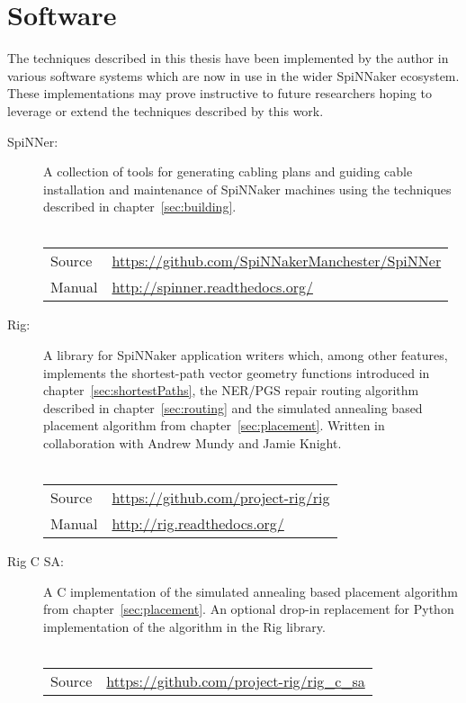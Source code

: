 \chapter{Software}
	\label{sec:software}
	
	The techniques described in this thesis have been implemented by the author
	in various software systems which are now in use in the wider SpiNNaker
	ecosystem. These implementations may prove instructive to future researchers
	hoping to leverage or extend the techniques described by this work.
	
	\begin{description}
		
		\item [SpiNNer:] A collection of tools for generating cabling plans and
		guiding cable installation and maintenance of SpiNNaker machines using the
		techniques described in chapter~\ref{sec:building}.
		\\
		\vspace*{-1.25em}
		\\
		\begin{tabular}{ll}
			Source & \url{https://github.com/SpiNNakerManchester/SpiNNer} \\
			Manual & \url{http://spinner.readthedocs.org/} \\
		\end{tabular}
		
		\item [Rig:] A library for SpiNNaker application writers which, among other
		features, implements the shortest-path vector geometry functions introduced
		in chapter~\ref{sec:shortestPaths}, the NER/PGS repair routing algorithm
		described in chapter~\ref{sec:routing} and the simulated annealing based
		placement algorithm from chapter~\ref{sec:placement}. Written in
		collaboration with Andrew Mundy and Jamie Knight.
		\\
		\vspace*{-1.25em}
		\\
		\begin{tabular}{ll}
			Source & \url{https://github.com/project-rig/rig} \\
			Manual & \url{http://rig.readthedocs.org/} \\
		\end{tabular}
		
		\item [Rig C SA:] A C implementation of the simulated annealing based
		placement algorithm from chapter~\ref{sec:placement}. An optional drop-in
		replacement for Python implementation of the algorithm in the Rig library.
		\\
		\vspace*{-1.25em}
		\\
		\begin{tabular}{ll}
			Source & \url{https://github.com/project-rig/rig_c_sa} \\
		\end{tabular}
		

\end{description}
